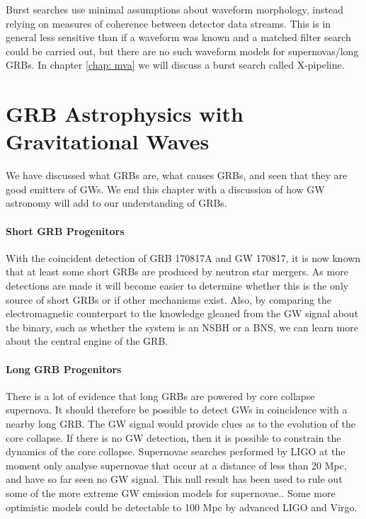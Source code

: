 \documentclass[11pt]{cuthesis}
\newcommand{\xpfs}{X-pipeline. }
\begin{document}
Burst searches use minimal assumptions about waveform morphology, instead relying on measures of coherence between detector data streams. This is in general less sensitive than if a waveform was known and a matched filter search could be carried out, but there are no such waveform models for supernovas/long GRBs. In chapter \ref{chap: mva} we will discuss a burst search called \xpfs 

\section{GRB Astrophysics with Gravitational Waves}
We have discussed what GRBs are, what causes GRBs, and seen that they are good emitters of GWs. We end this chapter with a discussion of how GW astronomy will add to our understanding of GRBs. 

\paragraph{Short GRB Progenitors}
With the coincident detection of GRB 170817A and GW 170817, it is now known that at least some short GRBs are produced by neutron star mergers. As more detections are made it will become easier to determine whether this is the only source of short GRBs or if other mechanisms exist. Also, by comparing the electromagnetic counterpart to the knowledge gleaned from the GW signal about the binary, such as whether the system is an NSBH or a BNS, we can learn more about the central engine of the GRB. 

\paragraph{Long GRB Progenitors}
There is a lot of evidence that long GRBs are powered by core collapse supernova. It should therefore be possible to detect GWs in coincidence with a nearby long GRB. The GW signal would provide clues as to the evolution of the core collapse. If there is no GW detection, then it is possible to constrain the dynamics of the core collapse. Supernovae searches performed by LIGO at the moment only analyse supernovae that occur at a distance of less than 20 Mpc, and have so far seen no GW signal. This null result has been used to rule out some of the more extreme GW emission models for supernovae.\cite{supernova_lvc}. Some more optimistic models could be detectable to 100 Mpc by advanced LIGO and Virgo.\cite{piro_pfahl,vanputten2,vanputten1}
\end{document}
